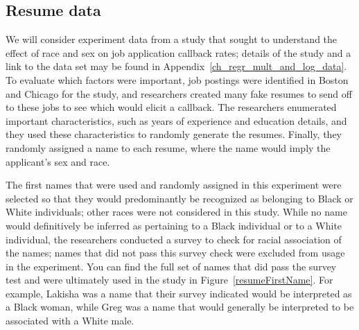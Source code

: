 
\subsection{Resume data}


\newcommand{\resN}{4870}
\newcommand{\resCallbackProp}{0.0805}
\newcommand{\resCallbackPerc}{8.05\%}
\newcommand{\resNumPred}{8}
\newcommand{\resUniqueNames}{36}
\newcommand{\resHonorsInt}{-2.4998}
\newcommand{\resHonorsCoef}{0.8668}
\newcommand{\resHonorsIntPlusCoef}{-1.6330}
\newcommand{\resHonorsCoefSE}{0.1776}
\newcommand{\resHonorsCoefZ}{4.88}
\newcommand{\resHonorsProb}{0.163}
\newcommand{\resHonorsPerc}{16.3\%}
\newcommand{\resHonorsNotProb}{0.076}
\newcommand{\resHonorsNotPerc}{7.6\%}

We will consider experiment data from a study that sought
to understand the effect of race and sex on job application
callback rates;
details of the study and a link to the data set may be
found in Appendix~\ref{ch_regr_mult_and_log_data}.
To evaluate which factors were important,
job postings were identified in Boston and Chicago
for the study,
and researchers created many fake resumes to send off
to these jobs to see which would elicit a callback.
The researchers enumerated important characteristics,
such as years of
experience and education details, and they used these
characteristics to randomly generate the resumes.
Finally, they randomly assigned a name to each resume,
where the name would imply the applicant's sex and race.

The first names that were used and randomly assigned
in this experiment were selected so that they
would predominantly be recognized as belonging
to Black or White individuals;
other races were not considered in this study.
While no name would definitively be inferred as pertaining
to a Black individual or to a White individual,
the researchers conducted a survey to check for
racial association of the names;
names that did not pass this survey check were excluded
from usage in the experiment.
You can find the full set of names that did pass the
survey test and were ultimately used in the study in
Figure~\ref{resumeFirstName}.
For example, Lakisha was a name that their survey indicated
would be interpreted as a Black woman, while Greg was a name
that would generally be interpreted to be associated with
a White male.


